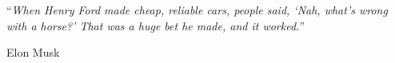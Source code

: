 
\vspace*{0.4\textheight}

\noindent\enquote{\itshape When Henry Ford made cheap, reliable cars, people said, ‘Nah, what’s wrong with a horse?’ That was a huge bet he made, and it worked.}\bigbreak

\hfill Elon Musk
